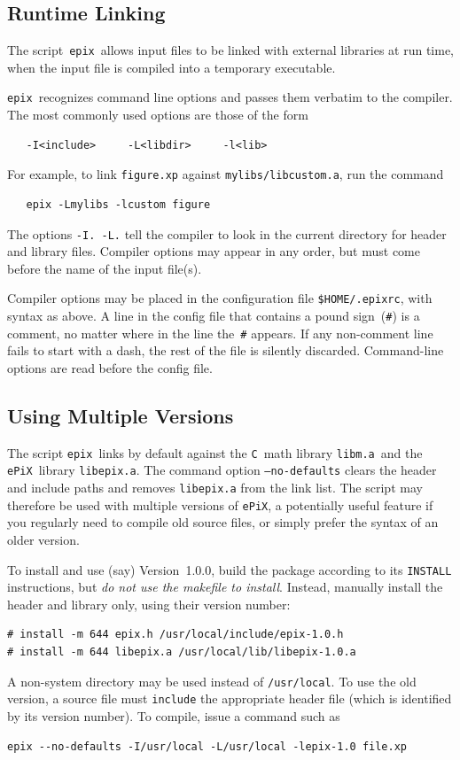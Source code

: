 \documentclass[12pt,letterpaper]{book}
\newcommand{\code}[1]{\texttt{#1}}
\newcommand{\filename}[1]{\texttt{#1}}
\newcommand{\ePiX}{\code{ePiX}}
\newcommand{\epix}{\code{epix}}
\begin{document}
\subsection{Runtime Linking}

The script~\epix\ allows input files to be linked with external
libraries at run time, when the input file is compiled into a
temporary executable.

\epix\ recognizes command line options and passes them verbatim to the
compiler. The most commonly used options are those of the form
\begin{verbatim}
   -I<include>     -L<libdir>     -l<lib>
\end{verbatim}
For example, to link \filename{figure.xp} against
\filename{mylibs/libcustom.a}, run the command
\begin{verbatim}
   epix -Lmylibs -lcustom figure
\end{verbatim}
The options \code{-I. -L.} tell the compiler to look in the current
directory for header and library files.  Compiler options may appear
in any order, but must come before the name of the input file(s).

Compiler options may be placed in the configuration file
\filename{\$HOME/.epixrc}, with syntax as above. A line in the config
file that contains a pound sign~(\code{\#}) is a comment, no matter
where in the line the~\code{\#} appears. If any non-comment line
fails to start with a dash, the rest of the file is silently
discarded.  Command-line options are read before the config file.


\subsection{Using Multiple Versions}

The script \filename{epix}~links by default against the \code{C}~math
library \code{libm.a}~and the \ePiX\ library \code{libepix.a}.  The
command option \code{--no-defaults} clears the header and include
paths and removes \code{libepix.a} from the link list. The script may
therefore be used with multiple versions of \ePiX, a potentially
useful feature if you regularly need to compile old source files, or
simply prefer the syntax of an older version.

To install and use (say) Version~1.0.0, build the package according to
its \filename{INSTALL} instructions, but \emph{do not use the makefile
  to install}. Instead, manually install the header and library only,
using their version number:
\begin{verbatim}
# install -m 644 epix.h /usr/local/include/epix-1.0.h
# install -m 644 libepix.a /usr/local/lib/libepix-1.0.a
\end{verbatim}
A non-system directory may be used instead of \filename{/usr/local}.
To use the old version, a source file must \code{include} the
appropriate header file (which is identified by its version number).
To compile, issue a command such as
\begin{verbatim}
epix --no-defaults -I/usr/local -L/usr/local -lepix-1.0 file.xp
\end{verbatim}
\end{document}

